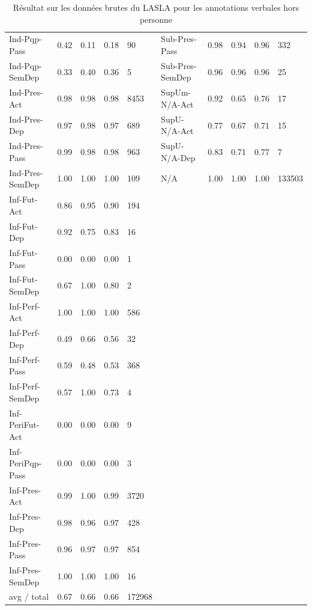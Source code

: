 \begin{table}[h]
{\begin{tabular}{@{}l|llll||l|llll@{}}
 Ind-Pqp-Pass      & 0.42      & 0.11   & 0.18     & 90      & Sub-Pres-Pass     & 0.98      & 0.94   & 0.96     & 332     \\ 
 Ind-Pqp-SemDep    & 0.33      & 0.40   & 0.36     & 5       & Sub-Pres-SemDep   & 0.96      & 0.96   & 0.96     & 25      \\ 
 Ind-Pres-Act      & 0.98      & 0.98   & 0.98     & 8453    & SupUm-N/A-Act       & 0.92      & 0.65   & 0.76     & 17      \\ 
 Ind-Pres-Dep      & 0.97      & 0.98   & 0.97     & 689     & SupU-N/A-Act        & 0.77      & 0.67   & 0.71     & 15      \\ 
 Ind-Pres-Pass     & 0.99      & 0.98   & 0.98     & 963     & SupU-N/A-Dep        & 0.83      & 0.71   & 0.77     & 7       \\ 
 Ind-Pres-SemDep   & 1.00      & 1.00   & 1.00     & 109     & N/A               & 1.00      & 1.00   & 1.00     & 133503  \\ 
 Inf-Fut-Act       & 0.86      & 0.95   & 0.90     & 194     \\ 
 Inf-Fut-Dep       & 0.92      & 0.75   & 0.83     & 16      \\ 
 Inf-Fut-Pass      & 0.00      & 0.00   & 0.00     & 1       \\ 
 Inf-Fut-SemDep    & 0.67      & 1.00   & 0.80     & 2       \\ 
 Inf-Perf-Act      & 1.00      & 1.00   & 1.00     & 586     \\ 
 Inf-Perf-Dep      & 0.49      & 0.66   & 0.56     & 32      \\ 
 Inf-Perf-Pass     & 0.59      & 0.48   & 0.53     & 368     \\ 
 Inf-Perf-SemDep   & 0.57      & 1.00   & 0.73     & 4       \\ 
 Inf-PeriFut-Act   & 0.00      & 0.00   & 0.00     & 9       \\ 
 Inf-PeriPqp-Pass  & 0.00      & 0.00   & 0.00     & 3       \\ 
 Inf-Pres-Act      & 0.99      & 1.00   & 0.99     & 3720    \\ 
 Inf-Pres-Dep      & 0.98      & 0.96   & 0.97     & 428     \\ 
 Inf-Pres-Pass     & 0.96      & 0.97   & 0.97     & 854     \\ 
 Inf-Pres-SemDep   & 1.00      & 1.00   & 1.00     & 16      \\ 
 avg / total       & 0.67      & 0.66   & 0.66     & 172968  \\ \bottomrule
\end{tabular}}
\caption{Résultat sur les données brutes du LASLA pour les annotations verbales hors personne}
\label{table:lasla:verb-scores}
\end{table}



